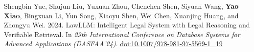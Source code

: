 Shengbin Yue, Shujun Liu, Yuxuan Zhou, Chenchen Shen, Siyuan Wang, \textbf{Yao Xiao}, Bingxuan Li, Yun Song, Xiaoyu Shen, Wei Chen, Xuanjing Huang, and Zhongyu Wei. 2024. LawLLM: Intelligent Legal System with Legal Reasoning and Verifiable Retrieval. In \textit{29th International Conference on Database Systems for Advanced Applications (DASFAA'24)}. \href{https://doi.org/10.1007/978-981-97-5569-1\_19}{doi:10.1007/978-981-97-5569-1\_19}
